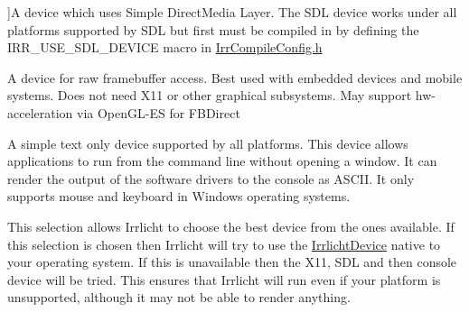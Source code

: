 \begin{Desc}
\begin{description}
{}]A device which uses Simple Direct\+Media Layer. The S\+DL device works under all platforms supported by S\+DL but first must be compiled in by defining the I\+R\+R\+\_\+\+U\+S\+E\+\_\+\+S\+D\+L\+\_\+\+D\+E\+V\+I\+CE macro in \hyperlink{IrrCompileConfig_8h_source}{Irr\+Compile\+Config.\+h} \item[{\em 
E\+I\+D\+T\+\_\+\+F\+R\+A\+M\+E\+B\+U\+F\+F\+ER\hypertarget{namespaceirr_ac25d94cf2e1037c7ca18ee79b3bd4505a5516da97d0b6ef1708a3a13cdb157bee}{}\label{namespaceirr_ac25d94cf2e1037c7ca18ee79b3bd4505a5516da97d0b6ef1708a3a13cdb157bee}
}]A device for raw framebuffer access. Best used with embedded devices and mobile systems. Does not need X11 or other graphical subsystems. May support hw-\/acceleration via Open\+G\+L-\/\+ES for F\+B\+Direct \item[{\em 
E\+I\+D\+T\+\_\+\+C\+O\+N\+S\+O\+LE\hypertarget{namespaceirr_ac25d94cf2e1037c7ca18ee79b3bd4505a54387cdabc602203abce675b027a3ede}{}\label{namespaceirr_ac25d94cf2e1037c7ca18ee79b3bd4505a54387cdabc602203abce675b027a3ede}
}]A simple text only device supported by all platforms. This device allows applications to run from the command line without opening a window. It can render the output of the software drivers to the console as A\+S\+C\+II. It only supports mouse and keyboard in Windows operating systems. \item[{\em 
E\+I\+D\+T\+\_\+\+B\+E\+ST\hypertarget{namespaceirr_ac25d94cf2e1037c7ca18ee79b3bd4505ad00f870da762af833dbab2eacc96ae0b}{}\label{namespaceirr_ac25d94cf2e1037c7ca18ee79b3bd4505ad00f870da762af833dbab2eacc96ae0b}
}]This selection allows Irrlicht to choose the best device from the ones available. If this selection is chosen then Irrlicht will try to use the \hyperlink{classirr_1_1IrrlichtDevice}{Irrlicht\+Device} native to your operating system. If this is unavailable then the X11, S\+DL and then console device will be tried. This ensures that Irrlicht will run even if your platform is unsupported, although it may not be able to render anything. \end{description}
\end{Desc}
